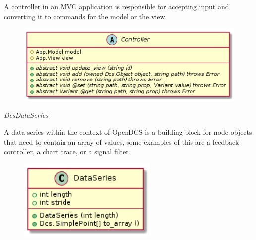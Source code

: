       \vspace*{-0.75cm}
      \begin{minipage}[t]{0.5\textwidth}
        \vspace*{0.5cm}
        A controller in an MVC application is responsible for accepting input
        and converting it to commands for the model or the view.
      \end{minipage} \hfill
      \begin{minipage}[t]{0.45\textwidth}
        \begin{figure}[H]
          \includegraphics[width=\textwidth]{figures/design/class/core/controller}
          \label{fig:dsg-classes-controller}
        \end{figure}
      \end{minipage}

      \emph{DcsDataSeries}

      \vspace*{-0.75cm}
      \begin{minipage}[t]{0.5\textwidth}
      	\vspace*{0.5cm}
        A data series within the context of OpenDCS is a building block for
        node objects that need to contain an array of values, some examples of
        this are a feedback controller, a chart trace, or a signal filter.
      \end{minipage} \hfill
      \begin{minipage}[t]{0.45\textwidth}
        \begin{figure}[H]
          \includegraphics[width=0.6\textwidth]{figures/design/class/core/dataseries}
          \label{fig:dsg-classes-data-series}
        \end{figure}
      \end{minipage}

